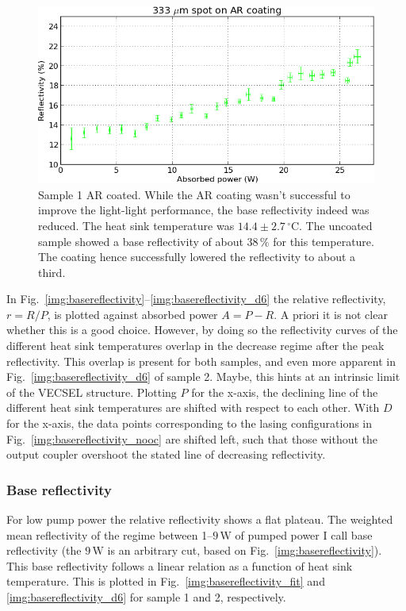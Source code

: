 \begin{figure}
\centering
\includegraphics[width=14.5cm]{img/refl_sampleAR.png}
\caption{Sample 1 AR coated.
While the AR coating wasn't successful
to improve the light-light performance,
the base reflectivity indeed was reduced.
The heat sink temperature was
$14.4\pm2.7\,^\circ\mathrm{C}$.
The uncoated sample showed
a base reflectivity of about $38\,\%$
for this temperature.
The coating hence successfully
lowered the reflectivity
to about a third.}
\label{img:refl_sampleAR}
\end{figure}

In Fig.~\ref{img:basereflectivity}--\ref{img:basereflectivity_d6}
the relative reflectivity,
$r=R/P$,
is plotted
against absorbed power $A=P-R$.
A priori
it is not clear
whether this is a good choice.
However,
by doing so
the reflectivity curves
of the different heat sink temperatures
overlap in the decrease regime
after the peak reflectivity.
This overlap
is present for both samples,
and even more apparent
in Fig.~\ref{img:basereflectivity_d6}
of sample 2.
Maybe,
this hints at
an intrinsic limit
of the VECSEL structure.
Plotting $P$ for the x-axis,
the declining line
of the different heat sink temperatures
are shifted with respect to each other.
With $D$ for the x-axis,
the data points corresponding
to the lasing configurations
in Fig.~\ref{img:basereflectivity_nooc}
are shifted left,
such that those
without the output coupler
overshoot the stated line
of decreasing reflectivity.


\subsubsection{Base reflectivity}

For low pump power
the relative reflectivity
shows a flat plateau.
The weighted mean reflectivity
of the regime between 1--$9\,\mathrm{W}$
of pumped power
I call base reflectivity
(the $9\,\mathrm{W}$ is an arbitrary cut,
based on Fig.~\ref{img:basereflectivity}).
This base reflectivity
follows a linear relation
as a function of heat sink temperature.
This is plotted in
Fig.~\ref{img:basereflectivity_fit}
and \ref{img:basereflectivity_d6}
for sample 1 and 2,
respectively.

